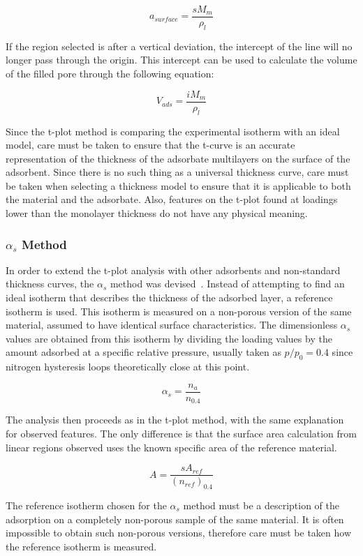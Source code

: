 \begin{equation}\label{pyg:fgr:areatplot}
	a_{surface} = \frac{s M_m}{\rho_{l}}
\end{equation}

If the region selected is after a vertical deviation, the intercept of 
the line will no longer pass through the origin. This intercept can 
be used to calculate the volume of the filled pore through the 
following equation:

\begin{equation}
	V_{ads} = \frac{i M_m}{\rho_{l}}
\end{equation}

Since the t-plot method is comparing the experimental isotherm 
with an ideal model, care must be taken to ensure that the t-curve
is an accurate representation of the thickness of the 
adsorbate multilayers on the surface of the adsorbent. 
Since there is no such thing as a universal thickness curve,
care must be taken when selecting a thickness model to ensure that it
is applicable to both the material and the adsorbate.
Also, features on the t-plot found at loadings lower than the monolayer
thickness do not have any physical meaning.

\subsubsection{\(\alpha_s\) Method}\label{pyg:charac:alphasplot}

In order to extend the t-plot analysis with other adsorbents and 
non-standard thickness curves, the \(\alpha_s\) method was
devised~\cite{atkinsonAdsorptivePropertiesMicroporous1984}.
Instead of attempting to find an ideal isotherm that describes the
thickness of the adsorbed layer, a reference isotherm is used.
This isotherm is measured on a non-porous version of the same material,
assumed to have identical surface characteristics.
The dimensionless \(\alpha_s\) values are obtained from this isotherm by
dividing the loading values by the amount adsorbed at a specific relative
pressure, usually taken as \(p/p_0=0.4\) since nitrogen hysteresis loops
theoretically close at this point.

\begin{equation}
	\alpha_s = \frac{n_a}{n_{0.4}}
\end{equation}

The analysis then proceeds as in the t-plot method, with the 
same explanation for observed features. The only difference is
that the surface area calculation from linear regions observed
uses the known specific area of the reference material.

\begin{equation}
	A = \frac{s A_{ref}}{(n_{ref})_{0.4}}
\end{equation}

The reference isotherm chosen for the \(\alpha_s\) method must 
be a description of the adsorption on a completely non-porous sample
of the same material. It is often impossible to obtain such 
non-porous versions, therefore care must be
taken how the reference isotherm is measured.